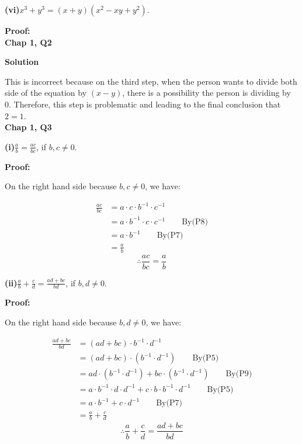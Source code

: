 \documentclass[a4paper,12pt]{report}
\begin{document}
\noindent
\textbf{(vi)}$x^3+y^3=(x+y)(x^2-xy+y^2)$.

\noindent
\textbf{Proof:}\\

\noindent
\textbf{Chap 1, Q2} 

\noindent
\textbf{Solution}

\noindent
This is incorrect because on the third step, when the person wants to divide both side of the equation by $(x-y)$, there is a possibility the person is dividing by 0. Therefore, this step is problematic and leading to the final conclusion that $2=1$.\\

\noindent
\textbf{Chap 1, Q3} 

\noindent
\textbf{(i)}$\frac{a}{b}=\frac{ac}{bc}$, if $b,c\neq 0$.

\noindent
\textbf{Proof:}

\noindent
On the right hand side because $b,c\neq 0$, we have:

\begin{align*}
 \frac{ac}{bc} & = a\cdot{c}\cdot{b^{-1}}\cdot{c^{-1}}\\
 			   & = a\cdot{b^{-1}}\cdot{c}\cdot{c^{-1}}\qquad \text{By(P8)}\\
 			   & = a\cdot{b^{-1}}\qquad \text{By(P7)}\\
 			   & = \frac{a}{b}
\end{align*}
\[\therefore \frac{ac}{bc}=\frac{a}{b}\]

\noindent
\textbf{(ii)}$\frac{a}{b} + \frac{c}{d}=\frac{ad+bc}{bd}$, if $b,d\neq 0$.

\noindent
\textbf{Proof:}

\noindent
On the right hand side because $b,d\neq 0$, we have:

\begin{align*}
 \frac{ad+bc}{bd} & = (ad+bc)\cdot{b^{-1}}\cdot{d^{-1}}\\
 			   & = (ad+bc)\cdot({b^{-1}}\cdot{d^{-1}})\qquad \text{By(P5)}\\
 			   & = ad\cdot({b^{-1}}\cdot{d^{-1}}) + bc\cdot({b^{-1}}\cdot{d^{-1}})\qquad \text{By(P9)}\\
 			   & = a\cdot{b^{-1}}\cdot{d}\cdot{d^{-1}} + c\cdot{b}\cdot{b^{-1}}\cdot{d^{-1}}\qquad \text{By(P5)}\\
 			   & = a \cdot{b^{-1}} + c\cdot{d^{-1}}\qquad \text{By(P7)}\\
 			   & = \frac{a}{b} + \frac{c}{d}
\end{align*}
\[\therefore \frac{a}{b} + \frac{c}{d}=\frac{ad+bc}{bd}\]
\end{document}
